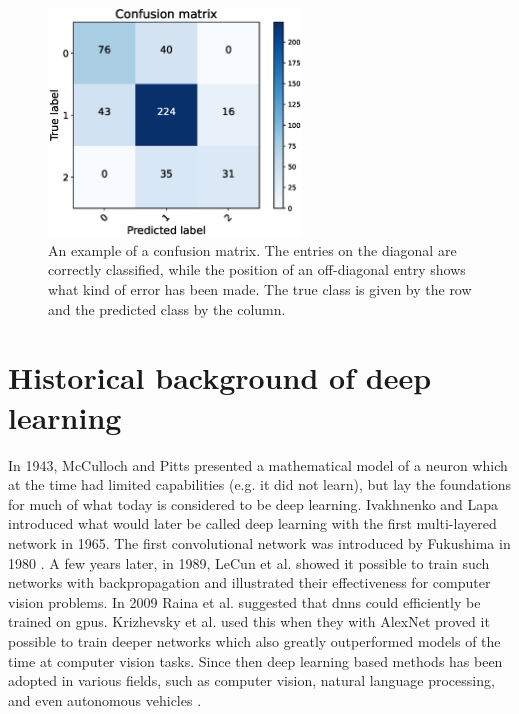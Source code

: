 \begin{figure}[h]
  \centering
  \includegraphics[width=0.6\textwidth]{files/figs/backg/conf-example.eps}
  \caption{An example of a confusion matrix. The entries on the diagonal are correctly classified, while the position of an off-diagonal entry shows what kind of error has been made. The true class is given by the row and the predicted class by the column.}
  \label{fig:conf-example}
\end{figure}

\section{Historical background of deep learning} \label{sec:dl-history}
In 1943, McCulloch and Pitts \cite{McCulloch1943} presented a mathematical model of a neuron which at the time had limited capabilities (e.g. it did not learn), but lay the foundations for much of what today is considered to be deep learning. Ivakhnenko and Lapa \cite{Ivakhnenko1965} introduced what would later be called deep learning with the first multi-layered network in 1965. The first convolutional network was introduced by Fukushima in 1980 \cite{Fukushima1980}.
A few years later, in 1989, LeCun et al. \cite{LeCun1989} showed it possible to train such networks with backpropagation and illustrated their effectiveness for computer vision problems. In 2009 Raina et al. \cite{Raina2009} suggested that \glspl{dnn} could efficiently be trained on \glspl{gpu}. Krizhevsky et al. \cite{Krizhevsky2012} used this when they with AlexNet proved it possible to train deeper networks which also greatly outperformed models of the time at computer vision tasks. Since then deep learning based methods has been adopted in various fields, such as computer vision, natural language processing, and even autonomous vehicles \cite{NazmusSaadat2020}.

